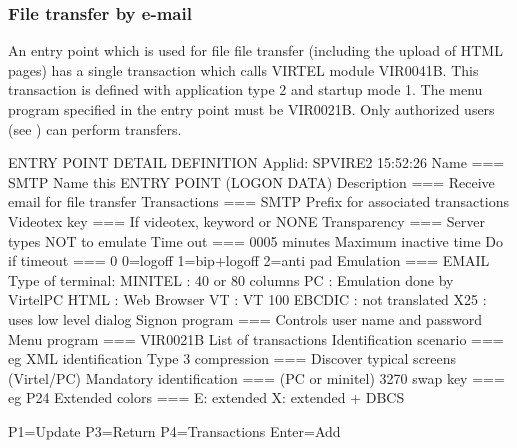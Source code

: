 \documentclass[letterpaper,10pt,english]{sphinxmanual}
\begin{document}


\subsubsection{File transfer by e-mail}
\label{\detokenize{User_Guide:file-transfer-by-e-mail}}
An entry point which is used for file file transfer (including the upload of HTML pages) has a single transaction which
calls VIRTEL module VIR0041B. This transaction is defined with application type 2 and startup mode 1. The menu
program specified in the entry point must be VIR0021B.
Only authorized users (see {\hyperref[\detokenize{User_Guide:v457ug-correspondent-management}]{}}) can perform transfers.

\begin{sphinxVerbatim}[commandchars=\\\{\}]
ENTRY POINT DETAIL DEFINITION \PYGZhy{}\PYGZhy{}\PYGZhy{}\PYGZhy{}\PYGZhy{}\PYGZhy{}\PYGZhy{}\PYGZhy{}\PYGZhy{}\PYGZhy{}\PYGZhy{}\PYGZhy{}\PYGZhy{}\PYGZhy{}\PYGZhy{}\PYGZhy{}\PYGZhy{}\PYGZhy{}\PYGZhy{}\PYGZhy{}\PYGZhy{}\PYGZhy{} Applid: SPVIRE2 15:52:26
Name          ===\PYGZgt{} SMTP                Name this ENTRY POINT (LOGON DATA)
Description   ===\PYGZgt{} Receive e\PYGZhy{}mail for file transfer
Transactions  ===\PYGZgt{} SMTP                Prefix for associated transactions
Videotex key  ===\PYGZgt{}                     If videotex, keyword or \PYGZdl{}NONE\PYGZdl{}
Transparency  ===\PYGZgt{}                     Server types NOT to emulate
Time out      ===\PYGZgt{} 0005   minutes      Maximum inactive time
Do if timeout ===\PYGZgt{} 0                   0=logoff 1=bip+logoff 2=anti pad
Emulation     ===\PYGZgt{} EMAIL               Type of terminal:
MINITEL : 40 or 80 columns             PC  : Emulation done by VirtelPC
HTML    : Web Browser                  VT  : VT 100
EBCDIC  : not translated               X25 : uses low level dialog
Signon program           ===\PYGZgt{}          Controls user name and password
Menu program             ===\PYGZgt{} VIR0021B  List of transactions
Identification scenario  ===\PYGZgt{}          eg XML identification
Type 3 compression       ===\PYGZgt{}          Discover typical screens (Virtel/PC)
Mandatory identification ===\PYGZgt{}                               (PC or minitel)
3270 swap key            ===\PYGZgt{}          eg P24
Extended colors          ===\PYGZgt{}          E: extended X: extended + DBCS

P1=Update                       P3=Return                  P4=Transactions
Enter=Add
\end{sphinxVerbatim}
\end{document}

